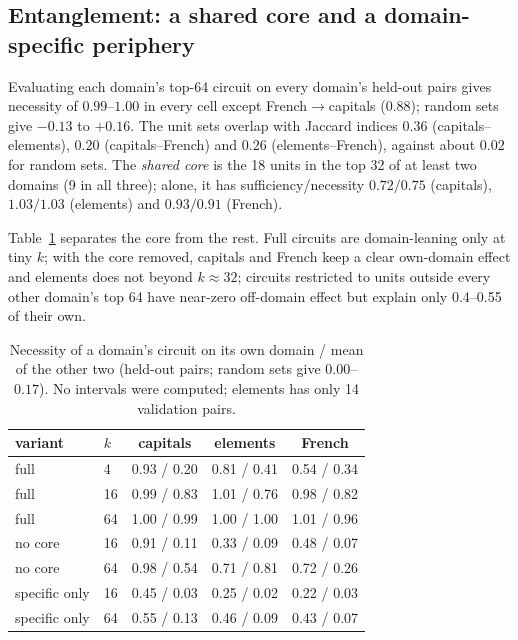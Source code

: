 \documentclass[11pt]{article}
\begin{document}
\subsection{Entanglement: a shared core and a domain-specific periphery}
Evaluating each domain's top-64 circuit on every domain's held-out pairs gives necessity of $0.99$--$1.00$ in every cell except French$\to$capitals ($0.88$); random sets give $-0.13$ to $+0.16$.
The unit sets overlap with Jaccard indices $0.36$ (capitals--elements), $0.20$ (capitals--French) and $0.26$ (elements--French), against about $0.02$ for random sets. The \emph{shared core} is the 18 units in the top 32 of at least two domains
(9 in all three); alone, it has sufficiency/necessity $0.72/0.75$ (capitals), $1.03/1.03$ (elements) and $0.93/0.91$ (French).

Table~\ref{tab:entangle} separates the core from the rest. Full circuits are domain-leaning only at tiny $k$; with the core removed, capitals and French keep a clear own-domain effect and elements
does not beyond $k\approx32$; circuits restricted to units outside every other domain's top 64 have near-zero off-domain effect but explain only 0.4--0.55 of their own.
\begin{table}[h]
\centering\small
\begin{tabular}{llccc}
\toprule
variant & $k$ & capitals & elements & French\\
\midrule
full & 4  & 0.93 / 0.20 & 0.81 / 0.41 & 0.54 / 0.34\\
full & 16 & 0.99 / 0.83 & 1.01 / 0.76 & 0.98 / 0.82\\
full & 64 & 1.00 / 0.99 & 1.00 / 1.00 & 1.01 / 0.96\\
no core & 16 & 0.91 / 0.11 & 0.33 / 0.09 & 0.48 / 0.07\\
no core & 64 & 0.98 / 0.54 & 0.71 / 0.81 & 0.72 / 0.26\\
specific only & 16 & 0.45 / 0.03 & 0.25 / 0.02 & 0.22 / 0.03\\
specific only & 64 & 0.55 / 0.13 & 0.46 / 0.09 & 0.43 / 0.07\\
\bottomrule
\end{tabular}
\caption{Necessity of a domain's circuit on its own domain / mean of the other two (held-out pairs; random sets give $0.00$--$0.17$). No intervals were computed; elements has only 14 validation pairs.}
\label{tab:entangle}
\end{table}
\end{document}
